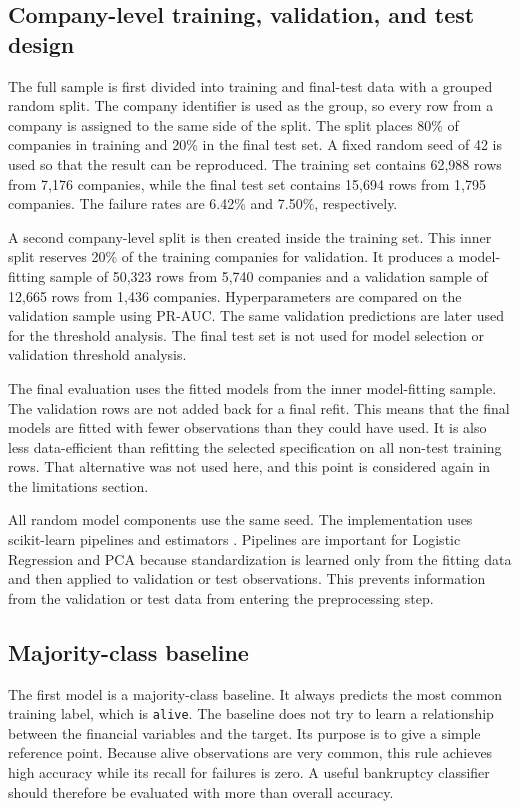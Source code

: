 \documentclass[11pt,a4paper]{article}
\begin{document}
\subsection{Company-level training, validation, and test design}

The full sample is first divided into training and final-test data with a
grouped random split. The company identifier is used as the group, so every row
from a company is assigned to the same side of the split. The split places 80\%
of companies in training and 20\% in the final test set. A fixed random seed of
42 is used so that the result can be reproduced. The training set contains
62,988 rows from 7,176 companies, while the final test set contains 15,694 rows
from 1,795 companies. The failure rates are 6.42\% and 7.50\%, respectively.

A second company-level split is then created inside the training set. This
inner split reserves 20\% of the training companies for validation. It produces
a model-fitting sample of 50,323 rows from 5,740 companies and a validation
sample of 12,665 rows from 1,436 companies. Hyperparameters are compared on the
validation sample using PR-AUC. The same validation predictions are later used
for the threshold analysis. The final test set is not used for model selection
or validation threshold analysis.

The final evaluation uses the fitted models from the inner model-fitting sample.
The validation rows are not added back for a final refit. This means that the
final models are fitted with fewer observations than they could have used. It is also less
data-efficient than refitting the selected specification on all non-test
training rows. That alternative was not used here, and this point is considered
again in the limitations section.

All random model components use the same seed. The implementation uses
scikit-learn pipelines and estimators \citep{pedregosa2011}. Pipelines are
important for Logistic Regression and PCA because standardization is learned
only from the fitting data and then applied to validation or test observations.
This prevents information from the validation or test data from entering the
preprocessing step.

\subsection{Majority-class baseline}

The first model is a majority-class baseline. It always predicts the most common
training label, which is \texttt{alive}. The baseline does not try to learn a
relationship between the financial variables and the target. Its purpose is to
give a simple reference point. Because alive observations are very common, this
rule achieves high accuracy while its recall for failures is zero. A useful
bankruptcy classifier should therefore be evaluated with more than overall
accuracy.
\end{document}
